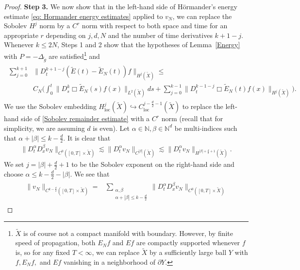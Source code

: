 \documentclass[11pt,letterpaper,oneside]{amsart}
\newcommand{\N}{\mathbb{N}}
\theoremstyle{definition}
\theoremstyle{remark}
\newcommand{\wt}{\widetilde}
\renewcommand{\d}{\partial}
\theoremstyle{definition}
\theoremstyle{remark}
\begin{document}
\begin{proof}
    \noindent \textbf{Step 3.} We now show that in the left-hand side of H\"ormander's energy estimate \eqref{eq: Hormander energy estimates} applied to $v_N$, we can replace the Sobolev $H^j$ norm by a $C^r$ norm with respect to both space and time for an appropriate $r$ depending on $j, d, N$ and the number of time derivatives $k + 1 - j$. Whenever $k \leq 2N$, Steps 1 and 2 show that the hypotheses of Lemma~\ref{Energy} with $P = - \Delta_{\wt g}$ are satisfied\footnote{$\wt X$ is of course not a compact manifold with boundary. However, by finite speed of propagation, both $E_N f$ and $E f$ are compactly supported whenever $f$ is, so for any fixed $T < \infty$, we can replace $\wt X$ by a sufficiently large ball $Y$ with $f, E_N f,$ and $Ef$ vanishing in a neighborhood of $\d Y$.} and
    \begin{align}\label{Sobolev remainder estimate}
        \begin{split}
            \sum_{j = 0}^{k + 1}& \| D_t^{k + 1 - j} (\wt E(t) - \wt E_N (t)) f \|_{H^j(\wt X)} \leq\\
            &C_N \bigg(\int_0^t \|D_s^{k} \Box \wt E_N (s) f(x)\|_{L^2(\wt X)} ds + \sum_{j = 0}^{k-1} \|D_t^{k - 1 - j} \Box \wt E_N(t) f(x) \|_{H^j(\wt X)} \bigg).
        \end{split}
    \end{align}
    We use the Sobolev embedding $H_{\text{loc}}^{j}(\wt X) \hookrightarrow C_{\text{loc}}^{j - \frac{d}{2} - 1}(\wt X)$ to replace the left-hand side of \eqref{Sobolev remainder estimate} with a $C^r$ norm (recall that for simplicity, we are assuming $d$ is even). Let $\alpha \in \N, \beta \in \N^d$ be multi-indices such that $\alpha + |\beta| \leq k - \frac{d}{2}$. It is clear that
    \begin{align*}
        \|D_t^\alpha D_x^\beta v_N\|_{C^0([0,T] \times \wt X)} \lesssim \| D_t^\alpha v_N\|_{C^{|\beta|}(\wt X)} \lesssim \|D_t^\alpha v_N\|_{H^{|\beta| + \frac{d}{2} + 1}(\wt X)}.
    \end{align*}
    We set $j = |\beta| + \frac{d}{2} + 1$ to be the Sobolev exponent on the right-hand side and choose $\alpha \leq k - \frac{d}{2} - |\beta|$. We see that
    \begin{align}
    \begin{split}
        \label{eq:Sobolev estimate}
        \|v_N\|_{C^{k - \frac{d}{2}}([0,T] \times \wt X)}
        = &
        \sum_{\substack{\alpha, \beta\\ \alpha + |\beta| \leq k - \frac{d}{2}}} \|D_t^\alpha D_x^\beta v_N\|_{C^0([0,T] \times \wt X)}

\end{split}
\end{align}
\end{proof}
\end{document}
